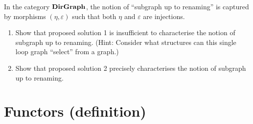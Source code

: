 \begin{exercise}
In the category $\mathbf {DirGraph}$, the notion of ``subgraph up to renaming'' is
captured by morphisms $(\eta,\varepsilon)$ such that both $\eta$ and
$\varepsilon$ are injections.
\begin{enumerate}
  \item
    Show that proposed solution 1 is insufficient to characterise the notion
    of subgraph up to renaming.  (Hint: Consider what structures can this
    single loop graph ``select'' from a graph.)
  \item
    Show that proposed solution 2 precisely characterises the notion of
    subgraph up to renaming.
\end{enumerate}
\end{exercise}

\chapter{Functors (definition)}

